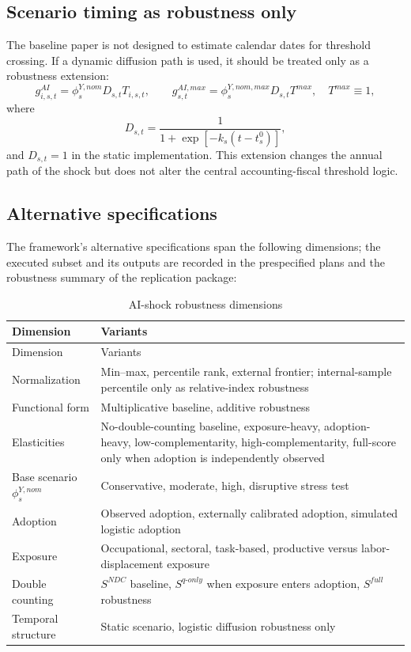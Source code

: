 \documentclass[11pt,a4paper]{article}
\begin{document}
\subsection{Scenario timing as robustness only}

The baseline paper is not designed to estimate calendar dates for threshold crossing. If a dynamic diffusion path is used, it should be treated only as a robustness extension:
\begin{equation}
    g^{AI}_{i,s,t}=\phi^{Y,nom}_s D_{s,t}T_{i,s,t},
    \qquad g^{AI,max}_{s,t}=\phi^{Y,nom,max}_sD_{s,t}T^{max},\quad T^{max}\equiv1,
\end{equation}
where
\begin{equation}
    D_{s,t}=\frac{1}{1+\exp[-k_s(t-t^0_s)]},
\end{equation}
and $D_{s,t}=1$ in the static implementation.
This extension changes the annual path of the shock but does not alter the central accounting-fiscal threshold logic.

\subsection{Alternative specifications}

The framework's alternative specifications span the following dimensions; the executed subset and its outputs are recorded in the prespecified plans and the robustness summary of the replication package:
\begin{longtable}{p{}p{}}
\caption{AI-shock robustness dimensions}\label{tab:ai_shock_robustness}\\
\toprule
Dimension & Variants \\
\midrule
\endfirsthead
\toprule
Dimension & Variants \\
\midrule
\endhead
Normalization & Min--max, percentile rank, external frontier; internal-sample percentile only as relative-index robustness \\
Functional form & Multiplicative baseline, additive robustness \\
Elasticities & No-double-counting baseline, exposure-heavy, adoption-heavy, low-complementarity, high-complementarity, full-score only when adoption is independently observed \\
Base scenario $\phi^{Y,nom}_s$ & Conservative, moderate, high, disruptive stress test \\
Adoption & Observed adoption, externally calibrated adoption, simulated logistic adoption \\
Exposure & Occupational, sectoral, task-based, productive versus labor-displacement exposure \\
Double counting & $S^{NDC}$ baseline, $S^{q\text{-}only}$ when exposure enters adoption, $S^{full}$ robustness \\
Temporal structure & Static scenario, logistic diffusion robustness only \\
\bottomrule
\end{longtable}
\end{document}
